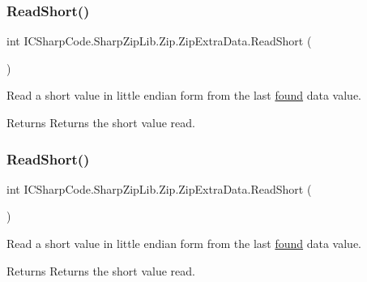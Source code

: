 \subsubsection{\texorpdfstring{Read\+Short()}{ReadShort()}\hspace{0.1cm}{\footnotesize\ttfamily [1/2]}}
{\footnotesize\ttfamily int I\+C\+Sharp\+Code.\+Sharp\+Zip\+Lib.\+Zip.\+Zip\+Extra\+Data.\+Read\+Short (\begin{DoxyParamCaption}{ }\end{DoxyParamCaption})\hspace{0.3cm}{\ttfamily [inline]}}



Read a short value in little endian form from the last \hyperlink{class_i_c_sharp_code_1_1_sharp_zip_lib_1_1_zip_1_1_zip_extra_data_a91e0c6c1d11967653256ccb161f9818c}{found} data value. 

\begin{DoxyReturn}{Returns}
Returns the short value read.
\end{DoxyReturn}
\mbox{\label{class_i_c_sharp_code_1_1_sharp_zip_lib_1_1_zip_1_1_zip_extra_data_a13e4cefe2f4873f46fc93cc043852e57}} 
\subsubsection{\texorpdfstring{Read\+Short()}{ReadShort()}\hspace{0.1cm}{\footnotesize\ttfamily [2/2]}}
{\footnotesize\ttfamily int I\+C\+Sharp\+Code.\+Sharp\+Zip\+Lib.\+Zip.\+Zip\+Extra\+Data.\+Read\+Short (\begin{DoxyParamCaption}{ }\end{DoxyParamCaption})\hspace{0.3cm}{\ttfamily [inline]}}



Read a short value in little endian form from the last \hyperlink{class_i_c_sharp_code_1_1_sharp_zip_lib_1_1_zip_1_1_zip_extra_data_a91e0c6c1d11967653256ccb161f9818c}{found} data value. 

\begin{DoxyReturn}{Returns}
Returns the short value read.
\end{DoxyReturn}
\mbox{\label{class_i_c_sharp_code_1_1_sharp_zip_lib_1_1_zip_1_1_zip_extra_data_afb83d24996e6234cdd6ed3b03785ec9c}} 
